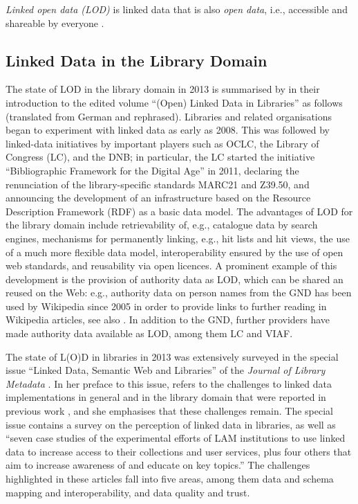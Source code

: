 \emph{Linked open data (LOD)} is linked data that is also \emph{open data},
i.e., accessible and shareable by everyone \autocite{WikiLinkedData}.




\subsection{Linked Data in the Library Domain}

The state of LOD in the library domain in 2013 is summarised by \textcite{Pohl2013}
in their introduction to the edited volume \enquote{(Open) Linked Data in Libraries} \autocite{Danowski2013}
as follows (translated from German and rephrased). Libraries and related organisations
began to experiment with linked data as early as 2008.
This was followed by linked-data initiatives by important players such as
OCLC, the Library of Congress (LC), and the DNB;
in particular, the LC started the initiative \enquote{Bibliographic Framework for the Digital Age} in 2011,
declaring the renunciation of the library-specific standards MARC21 and Z39.50,
and announcing the development of an infrastructure based on the Resource Description Framework (RDF) as a basic data model. The advantages of LOD for the library domain include
retrievability of, e.g., catalogue data by search engines,
mechanisms for permanently linking, e.g., hit lists and hit views,
the use of a much more flexible data model,
interoperability ensured by the use of open web standards,
and reusability via open licences.
A prominent example of this development is the provision of authority data as LOD,
which can be shared an reused on the Web:
e.g., authority data on person names from the GND has been used by Wikipedia since 2005
in order to provide links to further reading in Wikipedia articles, see also \autocite{Hengel2005}.
In addition to the GND, further providers have made authority data available as LOD,
among them LC and VIAF.

The state of L(O)D in libraries in 2013 was extensively surveyed in the special issue
\enquote{Linked Data, Semantic Web and Libraries} of the \emph{Journal of Library Metadata} \autocite{JLM13_2-3}.
In her preface to this issue, \textcite{Bair2013} refers to the challenges to linked data implementations
in general and in the library domain that were reported in previous work
\autocite{Bizer2009,Byrne2010,Gonzalez2011,Alemu2012},
and she emphasises that these challenges remain.
The special issue contains a survey on the perception of linked data in libraries,
as well as
\enquote{seven case studies of the experimental efforts of LAM institutions to use linked data to increase access to their collections and user services, plus four others that aim to increase awareness of and educate on key topics.}
The challenges highlighted in these articles fall into five areas,
among them data and schema mapping and interoperability, and data quality and trust.

